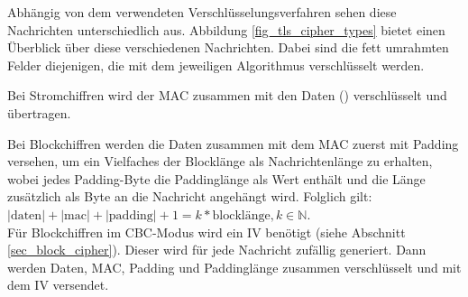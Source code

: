 Abhängig von dem verwendeten Verschlüsselungsverfahren sehen diese Nachrichten unterschiedlich aus. Abbildung \ref{fig_tls_cipher_types} bietet einen Überblick über diese verschiedenen Nachrichten. Dabei sind die fett umrahmten Felder diejenigen, die mit dem jeweiligen Algorithmus verschlüsselt werden.

Bei Stromchiffren wird der MAC zusammen mit den Daten () verschlüsselt und übertragen. 

Bei Blockchiffren werden die Daten zusammen mit dem MAC zuerst mit Padding versehen, um ein Vielfaches der Blocklänge als Nachrichtenlänge zu erhalten, wobei jedes Padding-Byte die Paddinglänge als Wert enthält und die Länge zusätzlich als Byte an die Nachricht angehängt wird. Folglich gilt:
\( |\text{daten}| + |\text{mac}| + |\text{padding}| + 1 = k * \text{blocklänge}, k \in \mathbb{N}\).\\
Für Blockchiffren im CBC-Modus wird ein IV benötigt (siehe Abschnitt \ref{sec_block_cipher}). Dieser wird für jede Nachricht zufällig generiert. Dann werden Daten, MAC, Padding und Paddinglänge zusammen verschlüsselt und mit dem IV versendet.

